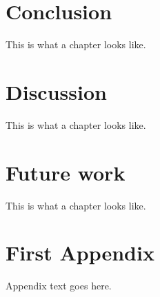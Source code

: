 \documentclass[a4paper,11pt]{kth-mag}
\begin{document}
\chapter{Conclusion}
This is what a chapter looks like.

\chapter{Discussion}
This is what a chapter looks like.

\chapter{Future work}
This is what a chapter looks like.
\\
\glsaddall
\printglossary
\printglossary[type=\acronymtype]




\appendix
\addappheadtotoc
\chapter{First Appendix}

Appendix text goes here.
\glsaddall
\end{document}
